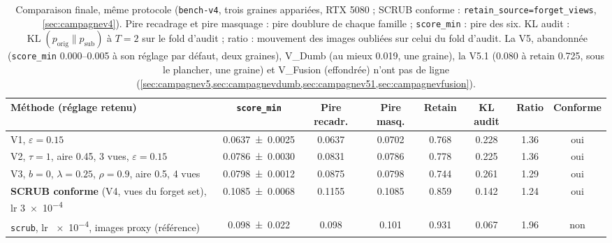 \documentclass[11pt,a4paper]{article}
\newcommand{\KL}{\operatorname{KL}}
\newcommand{\orig}{\mathrm{orig}}
\newcommand{\sub}{\mathrm{sub}}
\newcommand{\code}[1]{\texttt{#1}}
\begin{document}
\begin{table}[ht]
  \centering\small
  \caption{Comparaison finale, même protocole (\code{bench-v4}, trois graines appariées, RTX 5080 ;
  SCRUB conforme : \code{retain\_source=forget\_views}, \cref{sec:campagnev4}).
  Pire recadrage et pire masquage : pire doublure de chaque famille ; \code{score\_min} : pire
  des six. KL audit : $\KL(p_\orig\|p_\sub)$ à $T=2$ sur le fold d'audit ; ratio : mouvement des
  images oubliées sur celui du fold d'audit. La V5, abandonnée (\code{score\_min} \numrange{0.000}{0.005}
  à son réglage par défaut, deux graines), V\_Dumb (au mieux \num{0.019}, une graine), la V5.1
  (\num{0.080} à retain \num{0.725}, sous le plancher, une graine) et V\_Fusion (effondrée) n'ont pas
  de ligne (\cref{sec:campagnev5,sec:campagnevdumb,sec:campagnev51,sec:campagnevfusion}).}\label{tab:synthese}
  \setlength{\tabcolsep}{3.2pt}
  \begin{tabular}{@{}>{\raggedright}p{4.2cm} ccc S[table-format=1.3] S[table-format=1.3] S[table-format=1.2] c@{}}
    \toprule
    Méthode (réglage retenu) & \code{score\_min} & Pire recadr. & Pire masq. & {Retain} & {KL audit}
      & {Ratio} & Conforme\\
    \midrule
    V1, $\varepsilon=\num{0.15}$ & \num{0.0637 +- 0.0025} & \num{0.0637} & \num{0.0702} & 0.768 & 0.228
      & 1.36 & oui\\
    V2, $\tau=1$, aire \num{0.45}, 3 vues, $\varepsilon=\num{0.15}$ & \num{0.0786 +- 0.0030} &
      \num{0.0831} & \num{0.0786} & 0.778 & 0.225 & 1.36 & oui\\
    V3, $b=0$, $\lambda=\num{0.25}$, $\rho=\num{0.9}$, aire \num{0.5}, 4 vues & \num{0.0798 +- 0.0012}
      & \num{0.0875} & \num{0.0798} & 0.744 & 0.261 & 1.29 & oui\\
    \textbf{SCRUB conforme} (V4, vues du forget set), lr \num{3e-4} & \num{0.1085 +- 0.0068}
      & \num{0.1155} & \num{0.1085} & 0.859 & 0.142 & 1.24 & oui\\
    \midrule
    \code{scrub}, lr \num{e-4}, images proxy (référence) & \num{0.098 +- 0.022} & \num{0.098} & \num{0.101} & 0.931
      & 0.067 & 1.96 & non\\
    \bottomrule
  \end{tabular}
\end{table}
\end{document}
